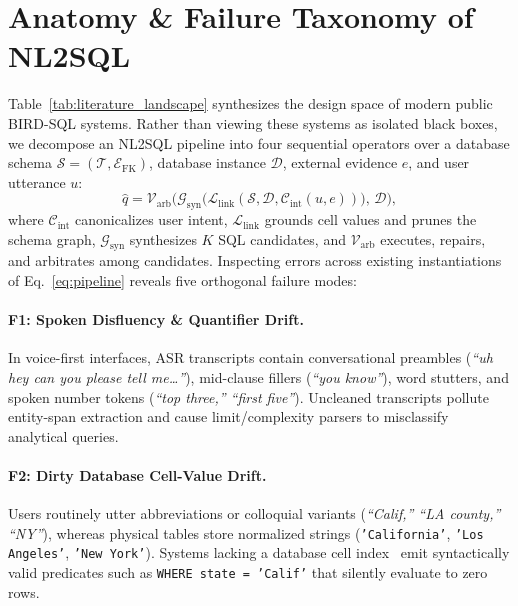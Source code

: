 \documentclass[10pt,twocolumn]{article}
\begin{document}
\section{Anatomy \& Failure Taxonomy of NL2SQL}
\label{sec:taxonomy}

Table~\ref{tab:literature_landscape} synthesizes the design space of modern public BIRD-SQL systems. Rather than viewing these systems as isolated black boxes, we decompose an NL2SQL pipeline into four sequential operators over a database schema $\mathcal{S} = (\mathcal{T}, \mathcal{E}_{\text{FK}})$, database instance $\mathcal{D}$, external evidence $e$, and user utterance $u$:
\begin{equation}
  \hat{q} = \mathcal{V}_{\text{arb}} \Big( \mathcal{G}_{\text{syn}} \big( \mathcal{L}_{\text{link}}(\mathcal{S}, \mathcal{D}, \mathcal{C}_{\text{int}}(u, e)) \big), \, \mathcal{D} \Big),
  \label{eq:pipeline}
\end{equation}
where $\mathcal{C}_{\text{int}}$ canonicalizes user intent, $\mathcal{L}_{\text{link}}$ grounds cell values and prunes the schema graph, $\mathcal{G}_{\text{syn}}$ synthesizes $K$ SQL candidates, and $\mathcal{V}_{\text{arb}}$ executes, repairs, and arbitrates among candidates. Inspecting errors across existing instantiations of Eq.~\eqref{eq:pipeline} reveals five orthogonal failure modes:

\paragraph{F1: Spoken Disfluency \& Quantifier Drift.}
In voice-first interfaces, ASR transcripts contain conversational preambles (\emph{``uh hey can you please tell me\dots''}), mid-clause fillers (\emph{``you know''}), word stutters, and spoken number tokens (\emph{``top three,'' ``first five''}). Uncleaned transcripts pollute entity-span extraction and cause limit/complexity parsers to misclassify analytical queries.

\paragraph{F2: Dirty Database Cell-Value Drift.}
Users routinely utter abbreviations or colloquial variants (\emph{``Calif,'' ``LA county,'' ``NY''}), whereas physical tables store normalized strings (\texttt{'California'}, \texttt{'Los Angeles'}, \texttt{'New York'}). Systems lacking a database cell index~\cite{pourreza2023dinsql,gao2024dailsql,wang2025macsql} emit syntactically valid predicates such as \texttt{WHERE state = 'Calif'} that silently evaluate to zero rows.
\end{document}
